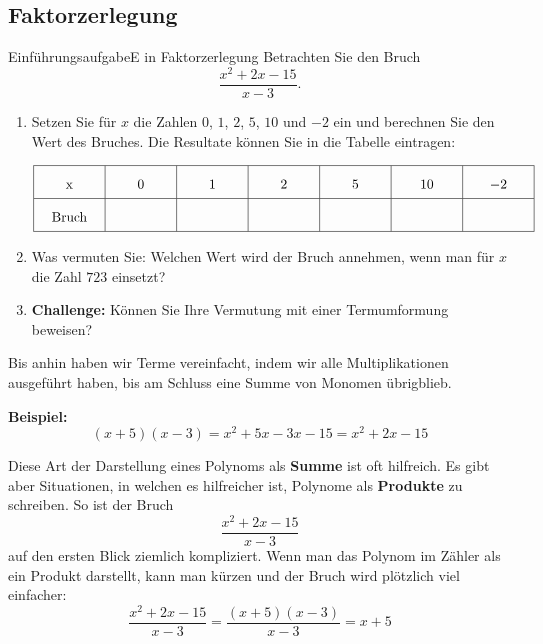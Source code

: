 \subsection{Faktorzerlegung}
\begin{LA}
    {Einführungsaufgabe}{E in Faktorzerlegung}
    Betrachten Sie den Bruch
    \[
        \frac{x^2+2x-15}{x-3}.
    \]

    \begin{enumerate}
        \item Setzen Sie für \(x\) die Zahlen \(0\), \(1\), \(2\), \(5\), \(10\) und \(-2\) ein und berechnen Sie den Wert des Bruches.
              Die Resultate können Sie in die Tabelle eintragen:

              \[
                  \renewcommand{\arraystretch}{2}
                  \begin{array}{
                          |>{\centering\arraybackslash}m{1.5cm}
                          |*{6}{>{\centering\arraybackslash}m{1.5cm}|}
                      }
                      \hline
                      x            & 0 & 1 & 2 & 5 & 10 & \(-2\) \\ \hline
                      \text{Bruch} &   &   &   &   &    &        \\ \hline
                  \end{array}
              \]

        \item Was vermuten Sie: Welchen Wert wird der Bruch annehmen, wenn man für \(x\) die Zahl \(723\) einsetzt?

        \item \textbf{Challenge:} Können Sie Ihre Vermutung mit einer Termumformung beweisen?
    \end{enumerate}
\end{LA}

\clearpage

Bis anhin haben wir Terme vereinfacht, indem wir alle Multiplikationen ausgeführt haben, bis am Schluss eine Summe von Monomen übrigblieb.

\textbf{Beispiel:}
\[
    (x+5)(x-3)
    = x^2+5x-3x-15
    = x^2+2x-15
\]

Diese Art der Darstellung eines Polynoms als \textbf{Summe} ist oft hilfreich. Es gibt aber Situationen, in welchen es hilfreicher ist, Polynome als \textbf{Produkte} zu schreiben. So ist der Bruch
\[
    \frac{x^2+2x-15}{x-3}
\]
auf den ersten Blick ziemlich kompliziert. Wenn man das Polynom im Zähler als ein Produkt darstellt, kann man kürzen und der Bruch wird plötzlich viel einfacher:
\[
    \frac{x^2+2x-15}{x-3}
    =
    \frac{(x+5)(x-3)}{x-3}
    =
    x+5
\]

